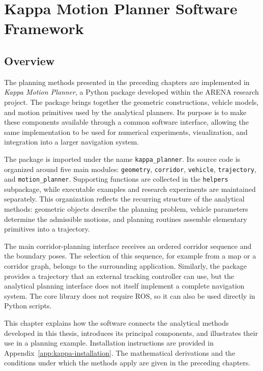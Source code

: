 \chapter{Kappa Motion Planner Software Framework}
\label{ch:kappa-software}

\section{Overview}

The planning methods presented in the preceding chapters are implemented in
\emph{Kappa Motion Planner}, a Python package developed within the ARENA research
project. The package brings together the geometric constructions, vehicle models,
and motion primitives used by the analytical planners. Its purpose is to make
these components available through a common software interface, allowing the
same implementation to be used for numerical experiments, visualization, and
integration into a larger navigation system.

The package is imported under the name \texttt{kappa\_planner}. Its source code
is organized around five main modules: \texttt{geometry}, \texttt{corridor},
\texttt{vehicle}, \texttt{trajectory}, and \texttt{motion\_planner}. Supporting
functions are collected in the \texttt{helpers} subpackage, while executable
examples and research experiments are maintained separately. This organization
reflects the recurring structure of the analytical methods: geometric objects
describe the planning problem, vehicle parameters determine the admissible
motions, and planning routines assemble elementary primitives into a trajectory.

The main corridor-planning interface receives an ordered corridor sequence and
the boundary poses. The selection of this sequence, for example from a map or a
corridor graph, belongs to the surrounding application. Similarly, the package
provides a trajectory that an external tracking controller can use, but the
analytical planning interface does not itself implement a complete navigation
system. The core library does not require ROS, so it can also be used directly
in Python scripts.

This chapter explains how the software connects the analytical methods developed
in this thesis, introduces its principal components, and illustrates their use
in a planning example. Installation instructions are provided in
Appendix~\ref{app:kappa-installation}. The mathematical derivations and the
conditions under which the methods apply are given in the preceding chapters.

